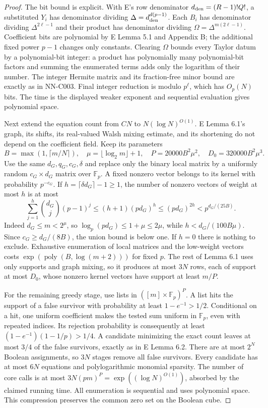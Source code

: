 \begin{proof}
The bit bound is explicit. With E's row denominator $d_{\rm den}=(R-1)!Q!$, a substituted $Y_i$ has denominator dividing $\Delta=d_{\rm den}^{d(p-1)}$. Each $B_i$ has denominator dividing $\Delta^{2\ell-1}$ and their product has denominator dividing $\Omega=\Delta^{m(2\ell-1)}$. Coefficient bits are polynomial by E Lemma 5.1 and Appendix B; the additional fixed power $p-1$ changes only constants. Clearing $\Omega$ bounds every Taylor datum by a polynomial-bit integer: a product has polynomially many polynomial-bit factors and summing the enumerated terms adds only the logarithm of their number. The integer Hermite matrix and its fraction-free minor bound are exactly as in NN-C003. Final integer reduction is modulo $p^\ell$, which has $O_p(N)$ bits. The time is the displayed weaker exponent and sequential evaluation gives polynomial space.

Next extend the equation count from $CN$ to $N(\log N)^{O(1)}$. E Lemma 6.1's graph, its shifts, its real-valued Walsh mixing estimate, and its shortening do not depend on the coefficient field. Keep its parameters
\[
 B=\max(1,\lceil m/N\rceil),\quad \mu=\lfloor\log_2m\rfloor+1,
 \quad P=20000B^2\mu^2,\quad D_0=320000B^2\mu^3.
\]
Use the same $d_G,q_G,c_G,\delta$ and replace only the binary local matrix by a uniformly random $c_G\times d_G$ matrix over $\mathbb F_p$. A fixed nonzero vector belongs to its kernel with probability $p^{-c_G}$. If $h=\lceil\delta d_G\rceil-1\geq1$, the number of nonzero vectors of weight at most $h$ is at most
\[
 \sum_{j=1}^h\binom{d_G}{j}(p-1)^j
 \leq(h+1)(p d_G)^h
 \leq(p d_G)^{2h}
 <p^{d_G/(25B)}.
\]
Indeed $d_G\leq m<2^\mu$, so $\log_p(p d_G)\leq1+\mu\leq2\mu$, while $h<d_G/(100B\mu)$. Since $c_G\geq d_G/(8B)$, the union bound is below one. If $h=0$ there is nothing to exclude. Exhaustive enumeration of local matrices and the low-weight vectors costs $\exp(\operatorname{poly}(B,\log(m+2)))$ for fixed $p$. The rest of Lemma 6.1 uses only supports and graph mixing, so it produces at most $3N$ rows, each of support at most $D_0$, whose nonzero kernel vectors have support at least $m/P$.

For the remaining greedy stage, use lists in $([m]\times\mathbb F_p)^P$. A list hits the support of a false survivor with probability at least $1-e^{-1}>1/2$. Conditional on a hit, one uniform coefficient makes the tested sum uniform in $\mathbb F_p$, even with repeated indices. Its rejection probability is consequently at least $(1-e^{-1})(1-1/p)>1/4$. A candidate minimizing the exact count leaves at most $3/4$ of the false survivors, exactly as in E Lemma 6.2. There are at most $2^N$ Boolean assignments, so $3N$ stages remove all false survivors. Every candidate has at most $6N$ equations and polylogarithmic monomial sparsity. The number of core calls is at most $3N(pm)^P=\exp((\log N)^{O(1)})$, absorbed by the claimed running time. All enumeration is sequential and uses polynomial space. This compression preserves the common zero set on the Boolean cube.


\end{proof}
